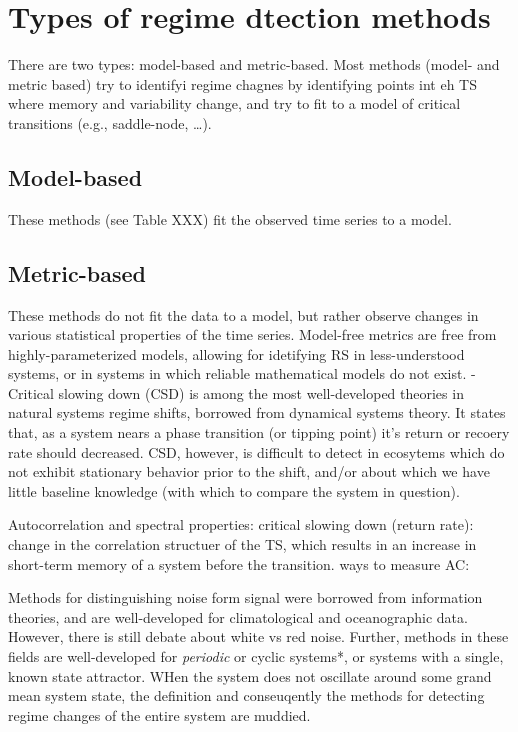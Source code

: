 \documentclass[12pt,twoside,openany]{reedthesis}
\begin{document}
\section{Types of regime dtection
methods}\label{types-of-regime-dtection-methods}

There are two types: model-based and metric-based. Most methods (model-
and metric based) try to identifyi regime chagnes by identifying points
int eh TS where memory and variability change, and try to fit to a model
of critical transitions (e.g., saddle-node, \ldots{}).

\subsection{Model-based}\label{model-based}

These methods (see Table XXX) fit the observed time series to a model.

\subsection{Metric-based}\label{metric-based}

These methods do not fit the data to a model, but rather observe changes
in various statistical properties of the time series. Model-free metrics
are free from highly-parameterized models, allowing for idetifying RS in
less-understood systems, or in systems in which reliable mathematical
models do not exist. - Critical slowing down (CSD) is among the most
well-developed theories in natural systems regime shifts, borrowed from
dynamical systems theory. It states that, as a system nears a phase
transition (or tipping point) it's return or recoery rate should
decreased. CSD, however, is difficult to detect in ecosytems which do
not exhibit stationary behavior prior to the shift, and/or about which
we have little baseline knowledge (with which to compare the system in
question).

Autocorrelation and spectral properties: critical slowing down (return
rate): change in the correlation structuer of the TS, which results in
an increase in short-term memory of a system before the transition. ways
to measure AC:

Methods for distinguishing noise form signal were borrowed from
information theories, and are well-developed for climatological and
oceanographic data. However, there is still debate about white vs red
noise. Further, methods in these fields are well-developed for
\emph{periodic} or cyclic systems*, or systems with a single, known
state attractor. WHen the system does not oscillate around some grand
mean system state, the definition and conseuqently the methods for
detecting regime changes of the entire system are muddied.
\end{document}
